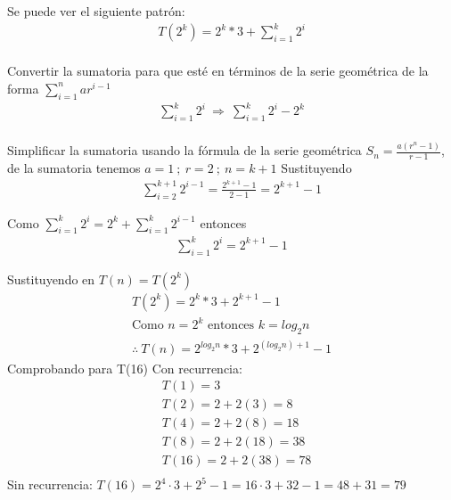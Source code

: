 \documentclass[11pt,letterpaper,fleqn]{article}
\begin{document}
Se puede ver el siguiente patrón:
\begin{equation*}
	\begin{aligned}
		T(2^{k}) = 2^{k}*3 + \sum_{i=1}^{k} 2^{i} \\
	\end{aligned}
\end{equation*}

Convertir la sumatoria para que esté en términos de la serie geométrica de la forma $\displaystyle \sum_{i=1}^{n}ar^{i-1}$
\begin{equation*}
	\begin{aligned}
		\sum_{i=1}^{k}2^{i} \ \Rightarrow \ \sum_{i=1}^{k}2^{i} -2^{k} \\
	\end{aligned}
\end{equation*}

Simplificar la sumatoria usando la fórmula de la serie geométrica $S_{n} = \frac{a(r^{n}-1)}{r-1}$, de la sumatoria tenemos $a = 1 \ ; \ r=2 \ ; \ n =k+1$ \smallbreak
Sustituyendo
\begin{equation*}
	\begin{aligned}
		\sum_{i=2}^{k+1}2^{i-1} = \frac{2^{k+1}-1}{2-1} = 2^{k+1}-1
	\end{aligned}
\end{equation*}

Como $\displaystyle \sum_{i=1}^{k} 2^{i} = 2^{k} + \sum_{i=1}^{k} 2^{i-1}$ entonces
\begin{equation*}
\begin{aligned}
	\sum_{i=1}^{k} 2^{i}=2^{k+1}-1
\end{aligned}
\end{equation*}

Sustituyendo en $T(n)=T(2^k)$
\begin{equation*}
\begin{aligned}
	T(2^{k}) = 2^{k}*3 + 2^{k+1} - 1 \\
	\text{Como $n=2^{k}$ entonces $k=log_{2}n$} \\
	\therefore \ T(n)=2^{log_{2}n}*3+2^{(log_{2}n)+1}-1
\end{aligned}
\end{equation*}
Comprobando para T(16) \smallbreak
Con recurrencia:
\begin{equation*}
\begin{aligned}
	&T(1) = 3\\
	&T(2) = 2 + 2(3) = 8 \\
	&T(4) = 2 + 2(8) = 18 \\
	&T(8) = 2 + 2(18) = 38 \\
	&T(16) = 2 + 2(38) = 78 \\
\end{aligned}
\end{equation*}
\qquad Sin recurrencia: \smallbreak
$T(16) = 2^{4}\cdot3+2^{5}-1=16\cdot3+32-1=48+31=79$
\end{document}
